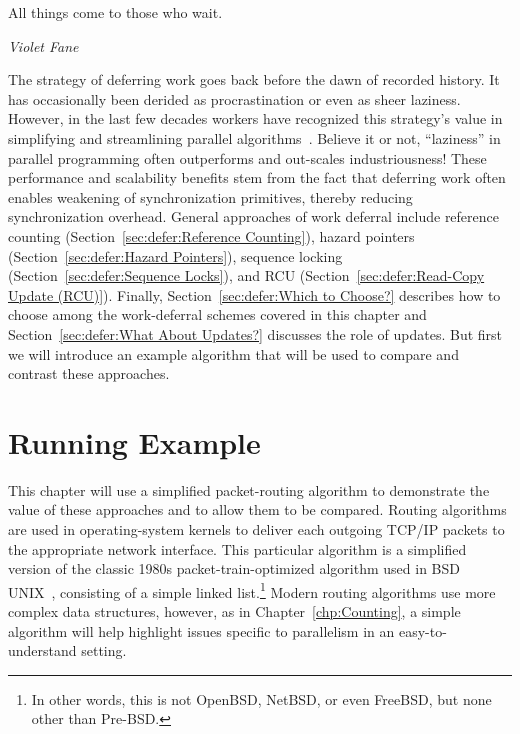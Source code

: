 

\epigraph{All things come to those who wait.}{\emph{Violet Fane}}

The strategy of deferring work goes back before the dawn of recorded
history. It has occasionally been derided as procrastination or
even as sheer laziness.
However, in the last few decades workers have recognized this strategy's value
in simplifying and streamlining parallel algorithms~\cite{Kung80,HMassalinPhD}.
Believe it or not, ``laziness'' in parallel programming often outperforms and
out-scales industriousness!
These performance and scalability benefits stem from the fact that
deferring work often enables weakening of synchronization primitives,
thereby reducing synchronization overhead.
General approaches of work deferral include
reference counting (Section~\ref{sec:defer:Reference Counting}),
hazard pointers (Section~\ref{sec:defer:Hazard Pointers}),
sequence locking (Section~\ref{sec:defer:Sequence Locks}),
and RCU (Section~\ref{sec:defer:Read-Copy Update (RCU)}).
Finally, Section~\ref{sec:defer:Which to Choose?}
describes how to choose among the work-deferral schemes covered in
this chapter and Section~\ref{sec:defer:What About Updates?}
discusses the role of updates.
But first we will introduce an example algorithm that will be used
to compare and contrast these approaches.

\section{Running Example}
\label{sec:defer:Running Example}

This chapter will use a simplified packet-routing algorithm to demonstrate
the value of these approaches and to allow them to be compared.
Routing algorithms are used in operating-system kernels to
deliver each outgoing TCP/IP packets to the appropriate network interface.
This particular algorithm is a simplified version of the classic 1980s
packet-train-optimized algorithm used in BSD UNIX~\cite{VanJacobson88},
consisting of a simple linked list.\footnote{
	In other words, this is not OpenBSD, NetBSD, or even
	FreeBSD, but none other than Pre-BSD.}
Modern routing algorithms use more complex data structures, however, as in
Chapter~\ref{chp:Counting}, a simple algorithm will
help highlight issues specific to parallelism in an
easy-to-understand setting.


